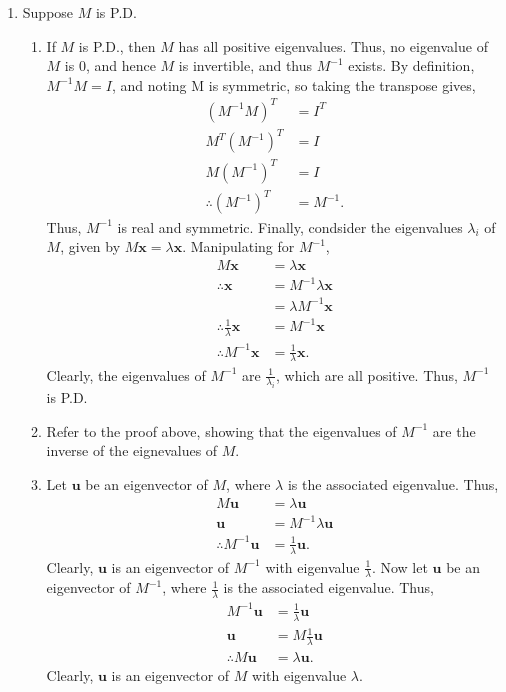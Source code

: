 \documentclass[a4paper,11pt]{article}
\newcommand{\ds}{\displaystyle}
\begin{document}
{{\begin{enumerate}[leftmargin=*]
		\pagebreak
		\item Suppose $\ds{M}$ is P.D.
			\begin{enumerate}[label=\alph*)]
				\item If $\ds{M}$ is P.D., then $\ds{M}$ has all positive eigenvalues. Thus, no eigenvalue of $\ds{M}$ is $\ds{0}$, and hence $\ds{M}$ is invertible, and thus $\ds{M^{-1}}$ exists. By definition, $\ds{M^{-1}M = I}$, and noting M is symmetric, so taking the transpose gives,
					\begin{align*}
						\left(M^{-1}M\right)^T & = I^T \\
						M^T\left(M^{-1}\right)^T & = I \\
						M\left(M^{-1}\right)^T & = I \\
						\therefore \left(M^{-1}\right)^T & = M^{-1}.
					\end{align*}
					Thus, $\ds{M^{-1}}$ is real and symmetric. Finally, condsider the eigenvalues $\ds{\lambda_i}$ of $\ds{M}$, given by $\ds{M\mathbf{x} = \lambda \mathbf{x}}$. Manipulating for $\ds{M^{-1}}$,
					\begin{align*}
						M\mathbf{x} & = \lambda \mathbf{x} \\
						\therefore \mathbf{x} & = M^{-1} \lambda \mathbf{x} \\
											  & = \lambda M^{-1} \mathbf{x} \\
						\therefore \frac{1}{\lambda} \mathbf{x} & = M^{-1} \mathbf{x} \\
						\therefore M^{-1} \mathbf{x} & = \frac{1}{\lambda} \mathbf{x}.
					\end{align*}
					Clearly, the eigenvalues of $\ds{M^{-1}}$ are $\ds{\frac{1}{\lambda_i}}$, which are all positive. Thus, $\ds{M^{-1}}$ is P.D.
				\item Refer to the proof above, showing that the eigenvalues of $\ds{M^{-1}}$ are the inverse of the eignevalues of $\ds{M}$.
				\item Let $\ds{\mathbf{u}}$ be an eigenvector of $\ds{M}$, where $\ds{\lambda}$ is the associated eigenvalue. Thus,
					\begin{align*}
						M\mathbf{u} & = \lambda \mathbf{u} \\
						\mathbf{u} & = M^{-1} \lambda \mathbf{u} \\
						\therefore M^{-1} \mathbf{u} & = \frac{1}{\lambda} \mathbf{u}.
					\end{align*}
					Clearly, $\ds{\mathbf{u}}$ is an eigenvector of $\ds{M^{-1}}$ with eigenvalue $\ds{\frac{1}{\lambda}}$. Now let $\ds{\mathbf{u}}$ be an eigenvector of $\ds{M^{-1}}$, where $\ds{\frac{1}{\lambda}}$ is the associated eigenvalue. Thus,
					\begin{align*}
						M^{-1}\mathbf{u} & = \frac{1}{\lambda} \mathbf{u} \\
						\mathbf{u} & = M \frac{1}{\lambda} \mathbf{u} \\
						\therefore M \mathbf{u} & = \lambda \mathbf{u}.
					\end{align*}
					Clearly, $\ds{\mathbf{u}}$ is an eigenvector of $\ds{M}$ with eigenvalue $\ds{\lambda}$.
			\end{enumerate}


\end{enumerate}}}
\end{document}
